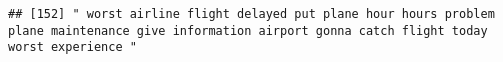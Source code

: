 \documentclass[
]{article}
\begin{document}
\begin{verbatim}
## [152] " worst airline flight delayed put plane hour hours problem plane maintenance give information airport gonna catch flight today worst experience "                                                                                                                                                                                                                                                                                                                                                                                                                                                                                                                                                                                                                                                                                                                                                                                                                                                                                                                                                                                                                                                                                                                                                                                                                                                                                                                                                                                                                                                                                                                                                                                                                                              

\end{verbatim}
\end{document}
